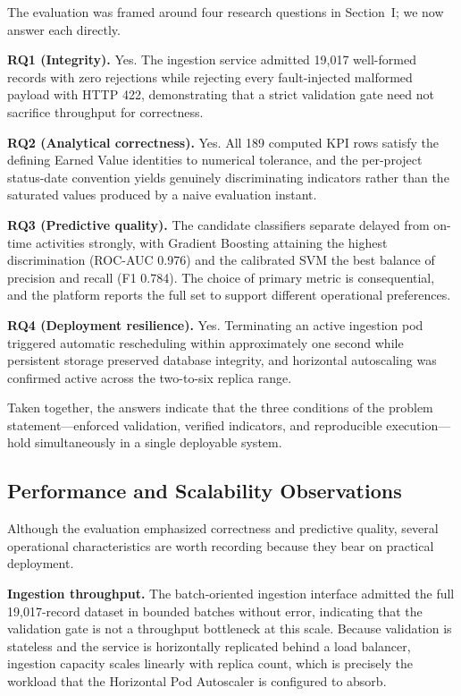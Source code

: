 \documentclass[conference]{IEEEtran}
\begin{document}
The evaluation was framed around four research questions in Section~I; we now answer each directly.

\textbf{RQ1 (Integrity).} Yes. The ingestion service admitted 19,017 well-formed records with zero rejections while rejecting every fault-injected malformed payload with HTTP 422, demonstrating that a strict validation gate need not sacrifice throughput for correctness.

\textbf{RQ2 (Analytical correctness).} Yes. All 189 computed KPI rows satisfy the defining Earned Value identities to numerical tolerance, and the per-project status-date convention yields genuinely discriminating indicators rather than the saturated values produced by a naive evaluation instant.

\textbf{RQ3 (Predictive quality).} The candidate classifiers separate delayed from on-time activities strongly, with Gradient Boosting attaining the highest discrimination (ROC-AUC 0.976) and the calibrated SVM the best balance of precision and recall (F1 0.784). The choice of primary metric is consequential, and the platform reports the full set to support different operational preferences.

\textbf{RQ4 (Deployment resilience).} Yes. Terminating an active ingestion pod triggered automatic rescheduling within approximately one second while persistent storage preserved database integrity, and horizontal autoscaling was confirmed active across the two-to-six replica range.

Taken together, the answers indicate that the three conditions of the problem statement---enforced validation, verified indicators, and reproducible execution---hold simultaneously in a single deployable system.

\subsection{Performance and Scalability Observations}

Although the evaluation emphasized correctness and predictive quality, several operational characteristics are worth recording because they bear on practical deployment.

\textbf{Ingestion throughput.} The batch-oriented ingestion interface admitted the full 19,017-record dataset in bounded batches without error, indicating that the validation gate is not a throughput bottleneck at this scale. Because validation is stateless and the service is horizontally replicated behind a load balancer, ingestion capacity scales linearly with replica count, which is precisely the workload that the Horizontal Pod Autoscaler is configured to absorb.
\end{document}
